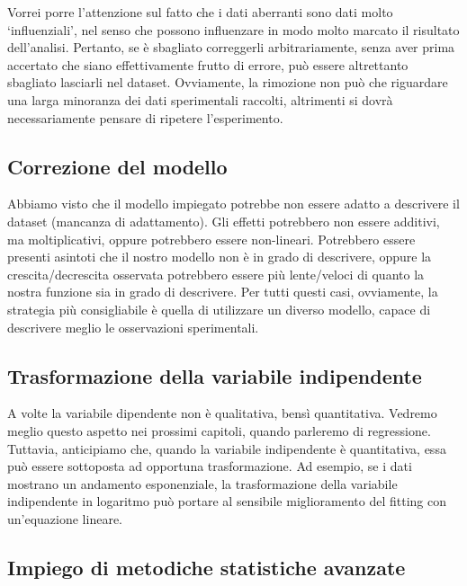 \documentclass[a4paper,12pt,oneside]{book}
\begin{document}
Vorrei porre l'attenzione sul fatto che i dati aberranti sono dati molto `influenziali', nel senso che possono influenzare in modo molto marcato il risultato dell'analisi. Pertanto, se è sbagliato correggerli arbitrariamente, senza aver prima accertato che siano effettivamente frutto di errore, può essere altrettanto sbagliato lasciarli nel dataset. Ovviamente, la rimozione non può che riguardare una larga minoranza dei dati sperimentali raccolti, altrimenti si dovrà necessariamente pensare di ripetere l'esperimento.

\hypertarget{correzione-del-modello}{%
\subsection{Correzione del modello}\label{correzione-del-modello}}

Abbiamo visto che il modello impiegato potrebbe non essere adatto a descrivere il dataset (mancanza di adattamento). Gli effetti potrebbero non essere additivi, ma moltiplicativi, oppure potrebbero essere non-lineari. Potrebbero essere presenti asintoti che il nostro modello non è in grado di descrivere, oppure la crescita/decrescita osservata potrebbero essere più lente/veloci di quanto la nostra funzione sia in grado di descrivere. Per tutti questi casi, ovviamente, la strategia più consigliabile è quella di utilizzare un diverso modello, capace di descrivere meglio le osservazioni sperimentali.

\hypertarget{trasformazione-della-variabile-indipendente}{%
\subsection{Trasformazione della variabile indipendente}\label{trasformazione-della-variabile-indipendente}}

A volte la variabile dipendente non è qualitativa, bensì quantitativa. Vedremo meglio questo aspetto nei prossimi capitoli, quando parleremo di regressione. Tuttavia, anticipiamo che, quando la variabile indipendente è quantitativa, essa può essere sottoposta ad opportuna trasformazione. Ad esempio, se i dati mostrano un andamento esponenziale, la trasformazione della variabile indipendente in logaritmo può portare al sensibile miglioramento del fitting con un'equazione lineare.

\hypertarget{impiego-di-metodiche-statistiche-avanzate}{%
\subsection{Impiego di metodiche statistiche avanzate}\label{impiego-di-metodiche-statistiche-avanzate}}
\end{document}
